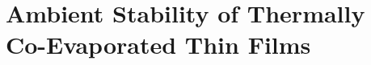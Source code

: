 \chapter{Ambient Stability of Thermally Co-Evaporated  Thin Films}\label{ch:stability}



\cleardoublepage

